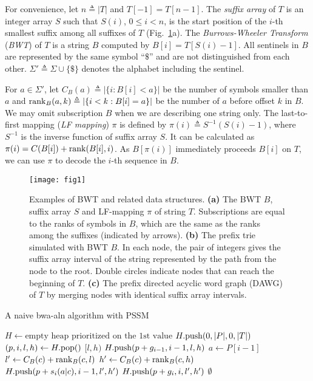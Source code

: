 \documentclass[webpdf,contemporary,large,namedate]{oup-authoring-template}%
\begin{document}
For convenience, let $n\triangleq|T|$ and $T[-1]=T[n-1]$.
The \emph{suffix array} of $T$ is an integer array $S$ such that $S(i)$,
$0\le i<n$, is the start position of the $i$-th smallest suffix among all suffixes of $T$ (Fig.~\ref{fig:1}a).
The \emph{Burrows-Wheeler Transform} (\emph{BWT}) of $T$ is a string $B$ computed by $B[i]=T[S(i)-1]$.
All sentinels in $B$ are represented by the same symbol ``$\$$'' and are not distinguished from each other.
$\Sigma'\triangleq\Sigma\cup\{\$\}$ denotes the alphabet including the sentinel.

For $a\in\Sigma'$, let $C_B(a)\triangleq|\{i:B[i]<a\}|$ be the number of symbols smaller than $a$
and ${\rm rank}_B(a,k)\triangleq|\{i<k:B[i]=a\}|$ be the number of $a$ before offset $k$ in $B$.
We may omit subscription $B$ when we are describing one string only.
The last-to-first mapping (\emph{LF mapping}) $\pi$ is defined by $\pi(i)\triangleq S^{-1}(S(i)-1)$,
where $S^{-1}$ is the inverse function of suffix array $S$.
It can be calculated as $\pi(i)=C(B[i])+{\rm rank}(B[i],i)$.
As $B[\pi(i)]$ immediately proceeds $B[i]$ on $T$, we can use $\pi$ to decode the $i$-th sequence in $B$.

\begin{figure}[bt]
\centering
\texttt{[image: fig1]}
\caption{Examples of BWT and related data structures.
{\bf (a)} The BWT $B$, suffix array $S$ and LF-mapping $\pi$ of string $T$.
Subscriptions are equal to the ranks of symbols in $B$, which are the same as the ranks among the suffixes (indicated by arrows).
{\bf (b)} The prefix trie simulated with BWT $B$.
In each node, the pair of integers gives the suffix array interval of the string represented by the path from the node to the root.
Double circles indicate nodes that can reach the beginning of $T$.
{\bf (c)} The prefix directed acyclic word graph (DAWG) of $T$ by merging nodes with identical suffix array intervals.}\label{fig:1}
\end{figure}

\begin{algorithm}[tb]
	\caption{A naive bwa-aln algorithm with PSSM}\label{algo:bwa-aln}
	\begin{algorithmic}[1]
			\State $H\gets\mbox{empty heap prioritized on the 1st value}$
			\State $H.{\rm push}(0,|P|,0,|T|)$
				\State $(p,i,l,h)\gets H.{\rm pop}()$
					\State \Return $[l,h)$
				\EndIf
				\State $H.{\rm push}(p+g_{i-1},i-1,l,h)$
				\State $a\gets P[i-1]$
					\State $l'\gets C_B(c)+{\rm rank}_B(c,l)$
					\State $h'\gets C_B(c)+{\rm rank}_B(c,h)$
					\Comment{$[l',h')$ is a child of $[l,h)$}
						\State $H.{\rm push}(p+s_i(a|c),i-1,l',h')$
						\State $H.{\rm push}(p+g_i,i,l',h')$
					\EndIf
				\EndFor
			\EndWhile
			\State \Return $\emptyset$
		\EndProcedure
	\end{algorithmic}
\end{algorithm}
\end{document}
